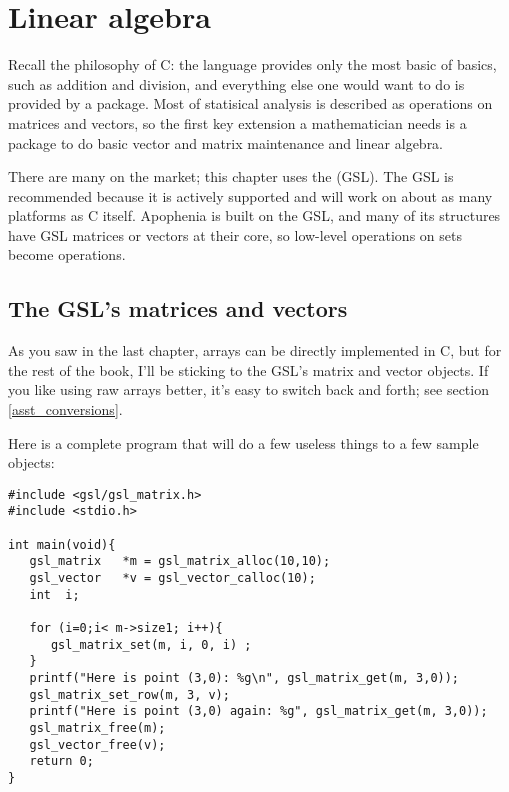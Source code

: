 \chapter[Linear Algebra]{Linear algebra} \label{linear_algebra}

Recall the philosophy of C: the language provides only the most basic of
basics, such as addition and division, and everything else one would
want to do is provided by a package. Most of statisical analysis is
described as operations on matrices and vectors, so the first key
extension a mathematician needs is a package to do basic vector and
matrix maintenance and linear algebra.

There are many on the market; this chapter uses the  (GSL). The GSL is recommended because it is actively supported
and will work on about as many platforms as C itself. Apophenia is built
on the GSL, and many of its structures have GSL matrices or vectors at
their core, so low-level operations on  sets become
 operations.

\section{The GSL's matrices and vectors}
As you saw in the last chapter, arrays can be directly implemented in C, but for
the rest of the book, I'll be sticking to the GSL's matrix and vector objects.
If you like using raw arrays better, it's easy to switch back and forth; see
section \ref{asst_conversions}.


Here is a complete program that will do a few useless things to a few sample
objects:\label{gslexample}
\begin{lstlisting}
#include <gsl/gsl_matrix.h>
#include <stdio.h>

int main(void){
   gsl_matrix   *m = gsl_matrix_alloc(10,10);
   gsl_vector   *v = gsl_vector_calloc(10);
   int  i;

   for (i=0;i< m->size1; i++){
      gsl_matrix_set(m, i, 0, i) ;
   }
   printf("Here is point (3,0): %g\n", gsl_matrix_get(m, 3,0));
   gsl_matrix_set_row(m, 3, v);
   printf("Here is point (3,0) again: %g", gsl_matrix_get(m, 3,0));
   gsl_matrix_free(m);
   gsl_vector_free(v);
   return 0;
}
\end{lstlisting}
